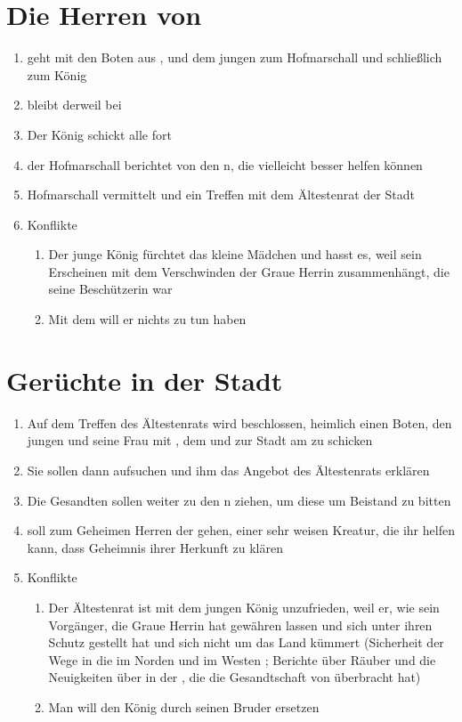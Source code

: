 \documentclass[12pt,a4paper,onecolumn,oneside,ngerman]{book}
\begin{document}
\chapter{Die Herren von \Rhingell}
\begin{enumerate}
  \item {\Arn} geht mit den Boten aus {\Lobarn}, {\Sena} und dem jungen {\Bangiri} zum Hofmarschall {\Isodoriin} und schließlich zum König
  \item {\Molitor} bleibt derweil bei {\Valem}
  \item Der König schickt alle fort
  \item der Hofmarschall berichtet von den {\Eisenmeister}n, die vielleicht besser helfen können
  \item Hofmarschall {\Isodoriin} vermittelt {\Arn} und {\Habino} ein Treffen mit dem Ältestenrat der Stadt
  \item Konflikte
  \begin{enumerate}
    \item Der junge König {\Kalemus} fürchtet das kleine Mädchen und hasst es, weil sein Erscheinen mit dem Verschwinden der Graue Herrin zusammenhängt, die seine Beschützerin war
    \item Mit dem {\Bangiri} will er nichts zu tun haben
  \end{enumerate}
\end{enumerate}

\chapter{Gerüchte in der Stadt}
\begin{enumerate}
  \item Auf dem Treffen des Ältestenrats wird beschlossen, heimlich einen Boten, den jungen {\Galeon} und seine Frau {\Demea} mit {\Sena}, dem {\Bangiri} und {\Molitor} zur Stadt {\Toris} am {\Dreifluss} zu schicken
  \item Sie sollen dann {\Kalemus} aufsuchen und ihm das Angebot des Ältestenrats erklären
  \item Die Gesandten sollen weiter zu den {\Eisenmeister}{n} ziehen, um diese um Beistand zu bitten
  \item {\Sena} soll zum Geheimen Herren der {\Eisenmeister} gehen, einer sehr weisen Kreatur, die ihr helfen kann, dass Geheimnis ihrer Herkunft zu klären
  \item Konflikte
  \begin{enumerate}
    \item Der Ältestenrat ist mit dem jungen König unzufrieden, weil er, wie sein Vorgänger, die Graue Herrin hat gewähren lassen und sich unter ihren Schutz gestellt hat und sich nicht um das Land kümmert (Sicherheit der Wege in die {\Bergmark} im Norden und im Westen ; Berichte über Räuber und die Neuigkeiten über {\Eisleute} in der {\Nordmark}, die die Gesandtschaft von {\Arn} überbracht hat)
    \item Man will den König durch seinen Bruder {\Kalemus} ersetzen 
  \end{enumerate}
\end{enumerate}
\end{document}
